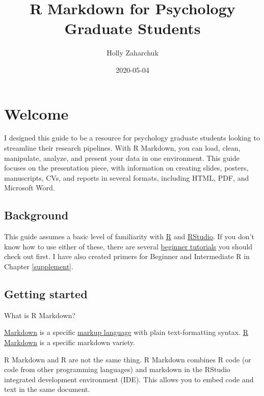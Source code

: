 \documentclass[
]{book}
\title{R Markdown for Psychology Graduate Students}
\author{Holly Zaharchuk}
\date{2020-05-04}
\begin{document}
\maketitle

{
\setcounter{tocdepth}{1}
\tableofcontents
}
\hypertarget{welcome}{%
\chapter{Welcome}\label{welcome}}

I designed this guide to be a resource for psychology graduate students looking to streamline their research pipelines. With R Markdown, you can load, clean, manipulate, analyze, and present your data in one environment. This guide focuses on the presentation piece, with information on creating slides, posters, manuscripts, CVs, and reports in several formats, including HTML, PDF, and Microsoft Word.

\hypertarget{background}{%
\section{Background}\label{background}}

This guide assumes a basic level of familiarity with \href{https://www.r-project.org/}{R} and \href{https://rstudio.com/products/rstudio/download/}{RStudio}. If you don't know how to use either of these, there are several \href{https://education.rstudio.com/learn/beginner/}{beginner tutorials} you should check out first. I have also created primers for Beginner and Intermediate R in Chapter \ref{supplement}.

\hypertarget{getting-started}{%
\section{Getting started}\label{getting-started}}

What is R Markdown?

\href{https://en.wikipedia.org/wiki/Markdown}{Markdown} is a specific \href{https://en.wikipedia.org/wiki/Markup_language}{markup language} with plain text-formatting syntax. \href{https://cran.r-project.org/web/packages/stationery/vignettes/Rmarkdown.pdf}{R Markdown} is a specific markdown variety.

R Markdown and R are not the same thing. R Markdown combines R code (or code from other programming languages) and markdown in the RStudio integrated development environment (IDE). This allows you to embed code and text in the same document.
\end{document}
